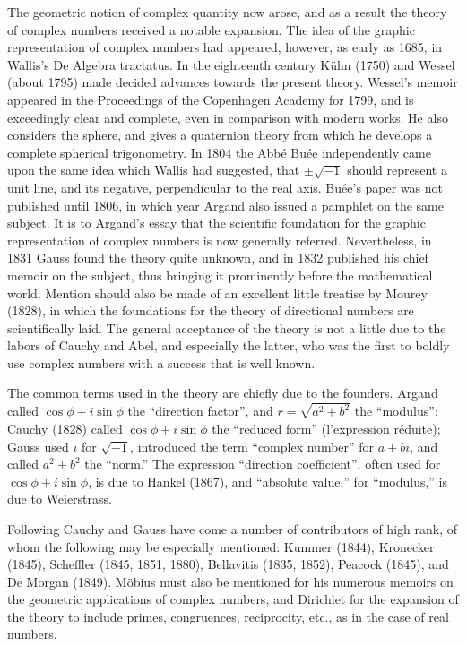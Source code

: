 \documentclass[oneside]{book}
\begin{document}
The geometric notion of complex quantity now arose, and as a result
the theory of complex numbers received a notable expansion. The idea
of the graphic representation of complex numbers had appeared,
however, as early as 1685, in Wallis's De Algebra tractatus. In the
eighteenth century K\"uhn (1750) and Wessel (about 1795) made
decided advances towards the present theory. Wessel's memoir
appeared in the Proceedings of the Copenhagen Academy for 1799, and
is exceedingly clear and complete, even in comparison with modern
works. He also considers the sphere, and gives a quaternion theory
from which he develops a complete spherical trigonometry. In 1804
the Abb\'e Bu\'ee independently came upon the same idea which Wallis
had suggested, that $\pm\sqrt{-1}$ should represent a unit line, and
its negative, perpendicular to the real axis. Bu\'ee's paper was
not published until 1806, in which year Argand also issued a
pamphlet on the same subject. It is to Argand's essay that the
scientific foundation for the graphic representation of complex
numbers is now generally referred. Nevertheless, in 1831 Gauss
found the theory quite unknown, and in 1832 published his chief
memoir on the subject, thus bringing it prominently before the
mathematical world. Mention should also be made of an excellent
little treatise by Mourey (1828), in which the foundations for the
theory of directional numbers are scientifically laid. The general
acceptance of the theory is not a little due to the labors of Cauchy
and Abel, and especially the latter, who was the first to boldly use
complex numbers with a success that is well known.

The common terms used in the theory are chiefly due to the
founders. Argand called $\cos \phi + i \sin \phi$ the ``direction
factor'', and $r = \sqrt{a^2+b^2}$ the ``modulus''; Cauchy (1828)
called $\cos \phi + i \sin \phi$ the ``reduced form'' (l'expression
r\'eduite); Gauss used $i$ for $\sqrt{-1}$, introduced the term
``complex number'' for $a+bi$, and called $a^2+b^2$ the ``norm.'' The
expression ``direction coefficient'', often used for $\cos \phi + i
\sin \phi$, is due to Hankel (1867), and ``absolute value,'' for
``modulus,'' is due to Weierstrass.

Following Cauchy and Gauss have come a number of contributors of
high rank, of whom the following may be especially mentioned: Kummer
(1844), Kronecker (1845), Scheffler (1845, 1851, 1880), Bellavitis
(1835, 1852), Peacock (1845), and De Morgan (1849). M\"obius must
also be mentioned for his numerous memoirs on the geometric
applications of complex numbers, and Dirichlet for the expansion of
the theory to include primes, congruences, reciprocity, etc., as in
the case of real numbers.
\end{document}

